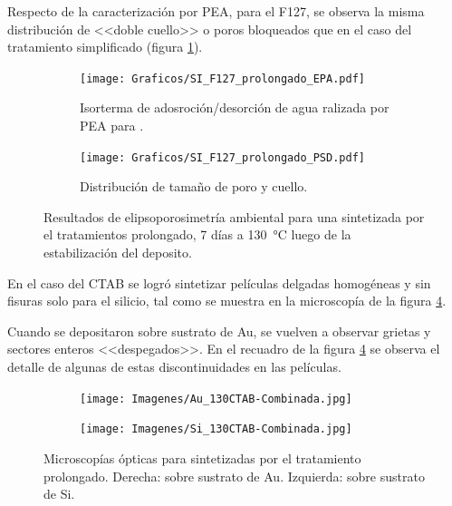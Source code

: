 {		Respecto de la caracterización por PEA, para el F127, se observa la misma distribución de <<doble cuello>> o poros bloqueados que en el caso del tratamiento simplificado (figura \ref{fig:F127_prolongado_EPA}). 

		 \begin{figure}[!ht]
			  	\begin{subfigure}[t]{0.495\textwidth}
			  	\texttt{[image: Graficos/SI\_F127\_prolongado\_EPA.pdf]}
				\caption{Isorterma de adosroción/desorción de agua ralizada por PEA para \pdmF.}
				\label{fig:F127_prolongado_EPA}
				\end{subfigure}
				\begin{subfigure}[t]{0.495\textwidth}
			  	\texttt{[image: Graficos/SI\_F127\_prolongado\_PSD.pdf]}
				\caption{Distribución de tamaño de poro y cuello.\\ }
				\label{fig:F127_prolongado_PSD}
				\end{subfigure}
				\caption[Elipsoporosimetría \pdmF\space tratamiento prolongado.]{Resultados de elipsoporosimetría ambiental para una \pdmF\space sintetizada por el tratamientos prolongado, 7 días a \SI{130}{\celsius} luego de la estabilización del deposito.}
		 		\end{figure}

		En el caso del CTAB se logró sintetizar películas delgadas homogéneas y sin fisuras solo para el silicio, tal como 
		se muestra en la microscopía de la figura \ref{fig:Microscopia_CTAB_prolongado}. 

		Cuando se depositaron sobre sustrato de Au, se vuelven a observar grietas y sectores enteros <<despegados>>. En el recuadro de la figura \ref{fig:Microscopia_CTAB_prolongado} se observa el detalle de algunas de estas discontinuidades en las películas. 		
		 \begin{figure}[!th]
	 	   	    \begin{subfigure}[t]{0.49\textwidth}
		       	\texttt{[image: Imagenes/Au\_130CTAB-Combinada.jpg]}
		   		\end{subfigure}
		   		\begin{subfigure}[t]{0.49\textwidth}
		   	    \texttt{[image: Imagenes/Si\_130CTAB-Combinada.jpg]}
		   		\end{subfigure}
				 \caption[Microscopía óptica \pdmC\space tratamiento prolongado.]{Microscopías ópticas para \pdmC\space sintetizadas por el tratamiento prolongado. Derecha: sobre sustrato de Au. Izquierda: sobre sustrato de Si.}
				 \label{fig:Microscopia_CTAB_prolongado}	
			     \end{figure}	
			     
}
